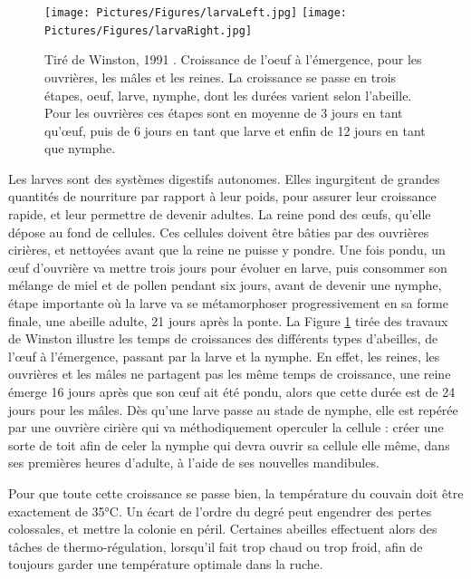 			\begin{figure}
			\centering
			\texttt{[image: Pictures/Figures/larvaLeft.jpg]}
			\texttt{[image: Pictures/Figures/larvaRight.jpg]}
			\caption[Tirée de Winston, 1991 \cite{winston_biology_1991}. Croissance de l'oeuf à l'émergence, pour les ouvrières, les mâles et les reines.]{Tiré de Winston, 1991 \cite{winston_biology_1991}. Croissance de l'oeuf à l'émergence, pour les ouvrières, les mâles et les reines. La croissance se passe en trois étapes, oeuf, larve, nymphe, dont les durées varient selon l'abeille. Pour les ouvrières ces étapes sont en moyenne de 3 jours en tant qu'œuf, puis de 6 jours en tant que larve et enfin de 12 jours en tant que nymphe.}
			\label{LarvaDev}
			\end{figure}
			
			Les larves sont des systèmes digestifs autonomes. Elles ingurgitent de grandes quantités de nourriture par rapport à leur poids, pour assurer leur croissance rapide, et leur permettre de devenir adultes. La reine pond des œufs, qu'elle dépose au fond de cellules. Ces cellules doivent être bâties par des ouvrières cirières, et nettoyées avant que la reine ne puisse y pondre. Une fois pondu, un œuf d'ouvrière va mettre trois jours pour évoluer en larve, puis consommer son mélange de miel et de pollen pendant six jours, avant de devenir une nymphe, étape importante où la larve va se métamorphoser progressivement en sa forme finale, une abeille adulte, 21 jours après la ponte. La Figure \ref{LarvaDev} tirée des travaux de Winston \cite{winston_biology_1991} illustre les temps de croissances des différents types d'abeilles, de l'œuf à l'émergence, passant par la larve et la nymphe. En effet, les reines, les ouvrières et les mâles ne partagent pas les même temps de croissance, une reine émerge 16 jours après que son œuf ait été pondu, alors que cette durée est de 24 jours pour les mâles. Dès qu'une larve passe au stade de nymphe, elle est repérée par une ouvrière cirière qui va méthodiquement operculer la cellule : créer une sorte de toit afin de celer la nymphe qui devra ouvrir sa cellule elle même, dans ses premières heures d'adulte, à l'aide de ses nouvelles mandibules.
			
			Pour que toute cette croissance se passe bien, la température du couvain doit être exactement de 35°C. Un écart de l'ordre du degré peut engendrer des pertes colossales, et mettre la colonie en péril. Certaines abeilles effectuent alors des tâches de thermo-régulation, lorsqu'il fait trop chaud ou trop froid, afin de toujours garder une température optimale dans la ruche.

